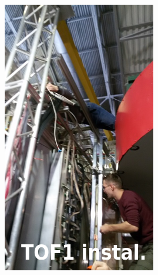 \documentclass[dvipsnames] {beamer}
\begin{document}
\begin{frame}
\begin{columns}[t]
       \includegraphics[width=.47\linewidth]{TOF400_installation.png}
   

     


\end{columns}
\end{frame}
\end{document}
